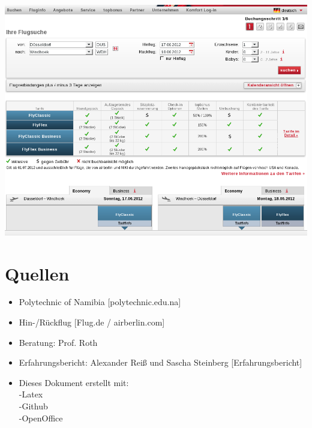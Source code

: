 \documentclass[11pt]{article}
\begin{document}
\includegraphics[scale=0.45]{Flug_Air_Berlin/Bildschirmfoto_am_2012-06-13_14_47_43.png} 

\section{Quellen}
\begin{itemize}

\item Polytechnic of Namibia  [polytechnic.edu.na]
\item Hin-/Rückflug [Flug.de / airberlin.com]
\item Beratung: Prof. Roth
\item Erfahrungsbericht: Alexander Reiß und Sascha Steinberg [Erfahrungsbericht]
\item Dieses Dokument erstellt mit:
	\\-Latex
	\\-Github
	\\-OpenOffice 
\end{itemize}
\end{document}
